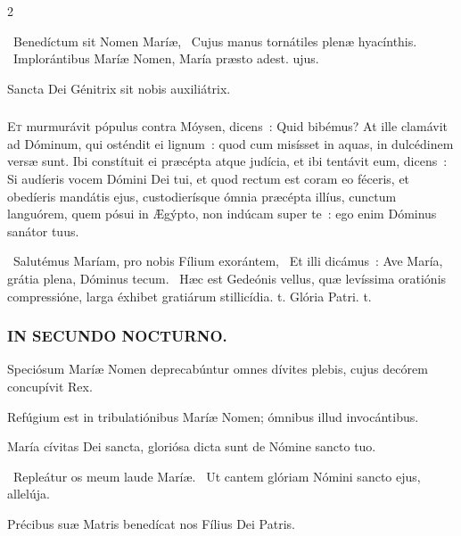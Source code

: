 \documentclass[9pt,twoside]{extarticle}
\begin{document}
\begin{multicols}{2}
\begin{tightlist}{}
\item {}~Benedíctum sit Nomen Maríæ, \textred{*}~Cujus manus tornátiles plenæ hyacínthis. ~Implorántibus Maríæ Nomen, María præsto adest. ujus.
\item {\small {} Sancta Dei Génitrix sit nobis auxiliátrix.}
\end{tightlist}

\subsubsection*{\center {}}
\lettrine{E}t murmurávit pópulus contra Móysen, dicens~: Quid bibémus? At ille clamávit ad Dóminum, qui osténdit ei lignum~: quod cum misísset in aquas, in dulcédinem versæ sunt. Ibi constítuit ei præcépta atque judícia, et ibi tentávit eum, dicens~: Si audíeris vocem Dómini Dei tui, et quod rectum est coram eo féceris, et obedíeris mandátis ejus, custodierísque ómnia præcépta illíus, cunctum languórem, quem pósui in Ægýpto, non indúcam super te~: ego enim Dóminus sanátor tuus.

\begin{tightlist}{}
\item {}~Salutémus Maríam, pro nobis Fílium exorántem, \textred{*}~Et illi dicámus~: Ave María, grátia plena, Dóminus tecum. ~Hæc est Gedeónis vellus, quæ levíssima oratiónis compressióne, larga éxhibet gratiárum stillicídia. t. Glória Patri. t.
\end{tightlist}

\subsubsection*{\center \textsc{IN SECUNDO NOCTURNO.}}
\begin{tightlist}{}
\item {} Speciósum Maríæ Nomen deprecabúntur omnes dívites plebis, cujus decórem concupívit Rex.
\item {} Refúgium est in tribulatiónibus Maríæ Nomen; ómnibus illud invocántibus.
\item {} María cívitas Dei sancta, gloriósa dicta sunt de Nómine sancto tuo.
\item {}~Repleátur os meum laude Maríæ. ~Ut cantem glóriam Nómini sancto ejus, allelúja.
\item {\small {} Précibus suæ Matris benedícat nos Fílius Dei Patris.}
\end{tightlist}


\end{multicols}
\end{document}
